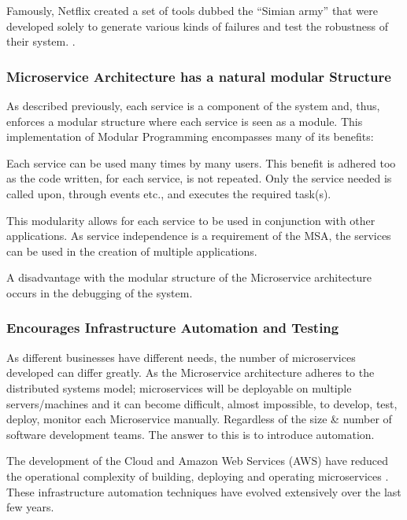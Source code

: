 Famously, Netflix created a set of tools dubbed the “Simian army” that were developed solely to generate various kinds of failures and test the robustness of their system. \cite{SimianArmy}. 

\subsubsection{Microservice Architecture has a natural modular Structure}
As described previously, each service is a component of the system and, thus, enforces a modular structure where each service is seen as a module. This implementation of Modular Programming \cite{TechopediaModular} encompasses many of its benefits:

Each service can be used many times by many users. This benefit is adhered too as the code written, for each service, is not repeated. Only the service needed is called upon, through events etc., and executes the required task(s).

This modularity allows for each service to be used in conjunction with other applications. As service independence is a requirement of the MSA, the services can be used in the creation of multiple applications.

A disadvantage with the modular structure of the Microservice architecture occurs in the debugging of the system.  

\subsubsection{Encourages Infrastructure Automation and Testing}
As different businesses have different needs, the number of microservices developed can differ greatly. As the Microservice architecture adheres to the distributed systems model; microservices will be deployable on multiple servers/machines and it can become difficult, almost impossible, to develop, test, deploy, monitor each Microservice manually. Regardless of the size \& number of software development teams. The answer to this is to introduce automation. 

The development of the Cloud and Amazon Web Services (AWS) have reduced the operational complexity of building, deploying and operating microservices \cite{MartinFowlersite}. These infrastructure automation techniques have evolved extensively over the last few years.


